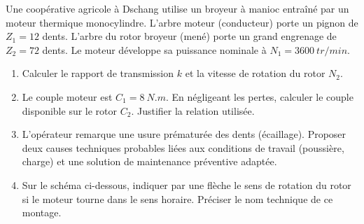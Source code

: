 \documentclass[11pt]{article}
\begin{document}
\begin{exercice}
Une coopérative agricole à Dschang utilise un broyeur à manioc entraîné par un moteur thermique monocylindre. L'arbre moteur (conducteur) porte un pignon de $Z_1 = 12$ dents. L'arbre du rotor broyeur (mené) porte un grand engrenage de $Z_2 = 72$ dents. Le moteur développe sa puissance nominale à $N_1 = \SI{3600}{tr/min}$.
\begin{enumerate}
    \item Calculer le rapport de transmission $k$ et la vitesse de rotation du rotor $N_2$.
    \item Le couple moteur est $C_1 = \SI{8}{N.m}$. En négligeant les pertes, calculer le couple disponible sur le rotor $C_2$. Justifier la relation utilisée.
    \item L'opérateur remarque une usure prématurée des dents (écaillage). Proposer deux causes techniques probables liées aux conditions de travail (poussière, charge) et une solution de maintenance préventive adaptée.
    \item Sur le schéma ci-dessous, indiquer par une flèche le sens de rotation du rotor si le moteur tourne dans le sens horaire. Préciser le nom technique de ce montage.
    \begin{center}
    \end{center}
\end{enumerate}
\end{exercice}
\end{document}
